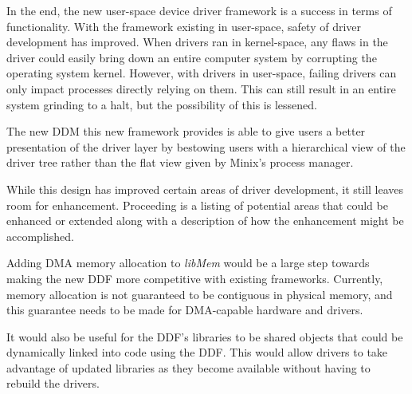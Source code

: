 
In the end, the new user-space device driver framework is a success in
terms of functionality.  
%
With the framework existing in user-space, safety of driver development
has improved.  When drivers ran in kernel-space, any flaws in the driver
could easily bring down an entire computer system by corrupting the operating
system kernel.  However, with drivers in user-space, failing drivers can
only impact processes directly relying on them.  This can still result in
an entire system grinding to a halt, but the possibility of this is lessened.

The new DDM this new framework provides is able to give
users a better presentation of the driver layer by bestowing users with a
hierarchical view of the driver tree rather than the flat view given by
Minix's process manager.

While this design has improved certain areas of driver development,
it still leaves room for enhancement.  Proceeding is a listing of potential
areas that could be enhanced or extended along with a description of how
the enhancement might be accomplished.

Adding DMA memory allocation to {\em libMem} would be a large step towards
making the new DDF more competitive with existing frameworks.  Currently,
memory allocation is not guaranteed to be contiguous in physical memory,
and this guarantee needs to be made for DMA-capable hardware and drivers.


It would also be useful for the DDF's libraries to be shared objects that could
be dynamically linked into code using the DDF.  This would allow drivers to
take advantage of updated libraries as they become available without having
to rebuild the drivers.


